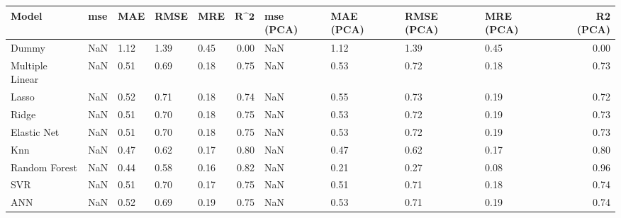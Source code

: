 \begin{table}
\centering
\label{table:iri_reg_pred}
\begin{tabular}{lllllrllllr}
\toprule
 \textbf{Model} & \textbf{mse} & \textbf{MAE} & \textbf{RMSE} & \textbf{MRE} & $\textbf{R^2}$ & \textbf{mse (PCA)} & \textbf{MAE (PCA)} & \textbf{RMSE (PCA)} & \textbf{MRE (PCA)} & \textbf{R2 (PCA)} \\
\midrule
          Dummy &          NaN &         1.12 &          1.39 &         0.45 &           0.00 &                NaN &               1.12 &                1.39 &               0.45 &              0.00 \\
Multiple Linear &          NaN &         0.51 &          0.69 &         0.18 &           0.75 &                NaN &               0.53 &                0.72 &               0.18 &              0.73 \\
          Lasso &          NaN &         0.52 &          0.71 &         0.18 &           0.74 &                NaN &               0.55 &                0.73 &               0.19 &              0.72 \\
          Ridge &          NaN &         0.51 &          0.70 &         0.18 &           0.75 &                NaN &               0.53 &                0.72 &               0.19 &              0.73 \\
    Elastic Net &          NaN &         0.51 &          0.70 &         0.18 &           0.75 &                NaN &               0.53 &                0.72 &               0.19 &              0.73 \\
            Knn &          NaN &         0.47 &          0.62 &         0.17 &           0.80 &                NaN &               0.47 &                0.62 &               0.17 &              0.80 \\
  Random Forest &          NaN &         0.44 &          0.58 &         0.16 &           0.82 &                NaN &               0.21 &                0.27 &               0.08 &              0.96 \\
            SVR &          NaN &         0.51 &          0.70 &         0.17 &           0.75 &                NaN &               0.51 &                0.71 &               0.18 &              0.74 \\
            ANN &          NaN &         0.52 &          0.69 &         0.19 &           0.75 &                NaN &               0.53 &                0.71 &               0.19 &              0.74 \\
\bottomrule
\end{tabular}
\end{table}
